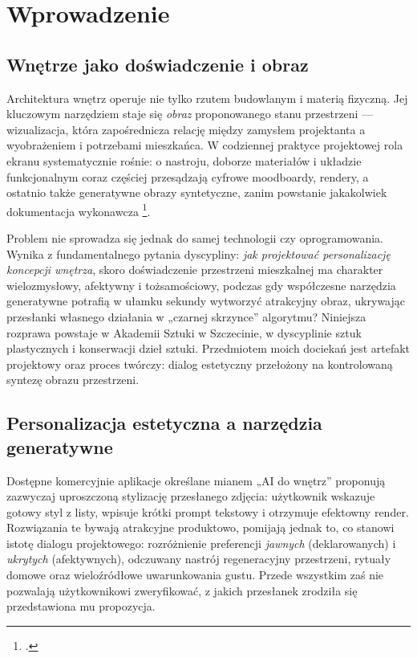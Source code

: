 \chapter{Wprowadzenie}
\label{ch01:top}

\section{Wnętrze jako doświadczenie i obraz}
\label{ch01:sec:tlo}

Architektura wnętrz operuje nie tylko rzutem budowlanym i materią fizyczną. Jej kluczowym narzędziem staje się \emph{obraz} proponowanego stanu przestrzeni --- wizualizacja, która zapośrednicza relację między zamysłem projektanta a wyobrażeniem i potrzebami mieszkańca.
W codziennej praktyce projektowej rola ekranu systematycznie rośnie: o nastroju, doborze materiałów i układzie funkcjonalnym coraz częściej przesądzają cyfrowe moodboardy, rendery, a ostatnio także generatywne obrazy syntetyczne, zanim powstanie jakakolwiek dokumentacja wykonawcza \textcolor{orange}{\footcite{pallasmaa2012oczy}}.

Problem nie sprowadza się jednak do samej technologii czy oprogramowania. Wynika z fundamentalnego pytania dyscypliny: \emph{jak projektować personalizację koncepcji wnętrza}, skoro doświadczenie przestrzeni mieszkalnej ma charakter wielozmysłowy, afektywny i tożsamościowy, podczas gdy współczesne narzędzia generatywne potrafią w ułamku sekundy wytworzyć atrakcyjny obraz, ukrywając przesłanki własnego działania w „czarnej skrzynce” algorytmu?
Niniejsza rozprawa powstaje w Akademii Sztuki w Szczecinie, w dyscyplinie sztuk plastycznych i konserwacji dzieł sztuki. Przedmiotem moich dociekań jest artefakt projektowy oraz proces twórczy: dialog estetyczny przełożony na kontrolowaną syntezę obrazu przestrzeni.

\section{Personalizacja estetyczna a narzędzia generatywne}
\label{ch01:sec:luka}

Dostępne komercyjnie aplikacje określane mianem „AI do wnętrz” proponują zazwyczaj uproszczoną stylizację przesłanego zdjęcia: użytkownik wskazuje gotowy styl z listy, wpisuje krótki prompt tekstowy i otrzymuje efektowny render.
Rozwiązania te bywają atrakcyjne produktowo, pomijają jednak to, co stanowi istotę dialogu projektowego: rozróżnienie preferencji \emph{jawnych} (deklarowanych) i \emph{ukrytych} (afektywnych), odczuwany nastrój regeneracyjny przestrzeni, rytuały domowe oraz wieloźródłowe uwarunkowania gustu. Przede wszystkim zaś nie pozwalają użytkownikowi zweryfikować, z jakich przesłanek zrodziła się przedstawiona mu propozycja.

